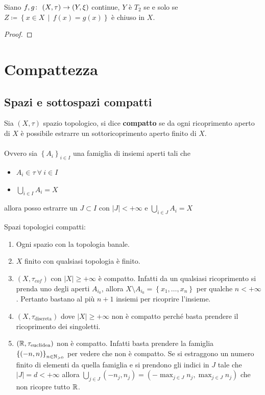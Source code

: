 \begin{theorem}
	Siano $f,g \colon\ (X,\tau) \rightarrow (Y,\xi)$ continue, $Y$ è $T_2$ se e solo se $Z \coloneqq \left\{x \in X \,\middle|\, f(x) = g(x) \right\}$ è chiuso in $X$.
\end{theorem}
\begin{proof}
\end{proof}



\section{Compattezza}
\subsection{\textcolor{TopGener}{\textbf{Spazi e sottospazi compatti}}}



\begin{definition}
	Sia $(X, \tau)$ spazio topologico, si dice \textbf{compatto} se da ogni ricoprimento aperto di $X$ è possibile estrarre un sottoricoprimento aperto finito di $X$. \\ \\ Ovvero sia $\left\{A_i\right\}_{i\in I}$ una famiglia di insiemi aperti tali che
	\begin{itemize}
		\item $A_i \in \tau \ \forall \ i\in I$
		\item $\bigcup_{i \in I} A_i = X$
	\end{itemize}
	allora posso estrarre un $J \subset I$ con $|J| < +\infty$ e $\bigcup_{i \in J} A_i = X$
\end{definition} 

\begin{example} Spazi topologici compatti:
\begin{enumerate}
	\item Ogni spazio con la topologia banale.
	\item $X$ finito con qualsiasi topologia è finito.
	\item $(X, \tau_{cof})$ con $|X| \ge +\infty$ è compatto. Infatti da un qualsiasi ricoprimento si prenda uno degli aperti $A_{i_0}$, allora $X \setminus A_{i_0} = \left\{x_1, \dots, x_n\right\}$ per qualche $n < +\infty$. Pertanto bastano al più $n+1$ insiemi per ricoprire l'insieme.
	\item $(X,\tau_{\text{discreta}})$ dove $|X| \ge +\infty$  non è compatto perché basta prendere il ricoprimento dei singoletti.
	\item $(\mathbb{R}, \tau_{\text{euclidea}})$ non è compatto. Infatti basta prendere la famiglia $\left\{(-n, n)\right\}_{n \in \mathbb{N}_{>0}}$ per vedere che non è compatto. Se si estraggono un numero finito di elementi da quella famiglia e si prendono gli indici in $J$ tale che $|J| = d < +\infty$ allora $\bigcup_{j \in J}(-n_j, n_j) = (-\max_{j \in J} n_j,  \max_{j \in J} n_j)$ che non ricopre tutto $\mathbb{R}$.
\end{enumerate}
\end{example}

